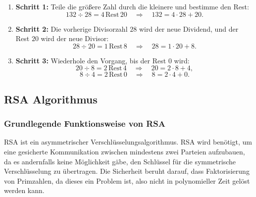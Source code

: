 \begin{enumerate}
    \item \textbf{Schritt 1:}  
    Teile die größere Zahl durch die kleinere und bestimme den Rest:  
    \[
    132 \div 28 = 4 \, \text{Rest} \, 20 \quad \Rightarrow \quad 132 = 4 \cdot 28 + 20.
    \]

    \item \textbf{Schritt 2:}  
    Die vorherige Divisorzahl $28$ wird der neue Dividend, und der Rest $20$ wird der neue Divisor:  
    \[
    28 \div 20 = 1 \, \text{Rest} \, 8 \quad \Rightarrow \quad 28 = 1 \cdot 20 + 8.
    \]

    \item \textbf{Schritt 3:}  
    Wiederhole den Vorgang, bis der Rest $0$ wird:  
    \[
    20 \div 8 = 2 \, \text{Rest} \, 4 \quad \Rightarrow \quad 20 = 2 \cdot 8 + 4,
    \]  
    \[
    8 \div 4 = 2 \, \text{Rest} \, 0 \quad \Rightarrow \quad 8 = 2 \cdot 4 + 0.
    \]
\end{enumerate}

\subsection{RSA Algorithmus}
\subsubsection{Grundlegende Funktionsweise von RSA}
RSA ist ein asymmetrischer Verschlüsselungsalgorithmus.
RSA wird benötigt, um eine gesicherte Kommunikation zwischen mindestens zwei Parteien aufzubauen, da 
es andernfalls keine Möglichkeit gäbe, den Schlüssel für die symmetrische Verschlüsselung  zu übertragen.
Die Sicherheit beruht darauf, dass Faktorisierung von Primzahlen, da dieses ein  Problem ist\cite{moolchad_leveraging_nodate},
also nicht in polynomieller Zeit gelöst werden kann. 


